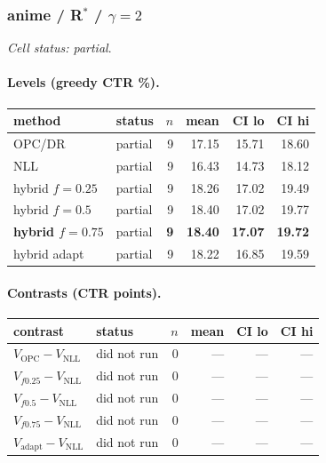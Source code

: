 \documentclass[10pt,a4paper]{article}
\begin{document}
\subsubsection{anime / R$^*$ / $\gamma=2$}
\emph{Cell status: partial}.
\paragraph{Levels (greedy CTR \%).}
{\centering\small\begin{tabular}{llrrrr}
\toprule method & status & $n$ & mean & CI lo & CI hi \\
\midrule
OPC/DR & partial & 9 & 17.15 & 15.71 & 18.60 \\
NLL & partial & 9 & 16.43 & 14.73 & 18.12 \\
hybrid $f{=}0.25$ & partial & 9 & 18.26 & 17.02 & 19.49 \\
hybrid $f{=}0.5$ & partial & 9 & 18.40 & 17.02 & 19.77 \\
\textbf{hybrid $f{=}0.75$} & partial & \textbf{9} & \textbf{18.40} & \textbf{17.07} & \textbf{19.72} \\
hybrid adapt & partial & 9 & 18.22 & 16.85 & 19.59 \\
\bottomrule\end{tabular}\par}
\paragraph{Contrasts (CTR points).}
{\centering\small\begin{tabular}{llrrrr}
\toprule contrast & status & $n$ & mean & CI lo & CI hi \\
\midrule
$V_{\mathrm{OPC}}-V_{\mathrm{NLL}}$ & did not run & 0 & --- & --- & --- \\
$V_{f0.25}-V_{\mathrm{NLL}}$ & did not run & 0 & --- & --- & --- \\
$V_{f0.5}-V_{\mathrm{NLL}}$ & did not run & 0 & --- & --- & --- \\
$V_{f0.75}-V_{\mathrm{NLL}}$ & did not run & 0 & --- & --- & --- \\
$V_{\mathrm{adapt}}-V_{\mathrm{NLL}}$ & did not run & 0 & --- & --- & --- \\
\bottomrule\end{tabular}\par}
\end{document}
